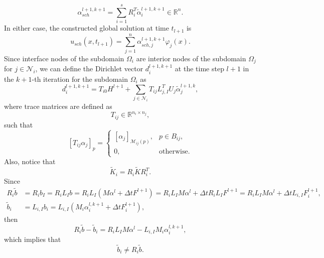 \documentclass[a4paper, 11pt]{article}
\theoremstyle{plain}
\theoremstyle{definition}
\theoremstyle{remark}
\begin{document}
\begin{equation*}
    \alpha_{sch}^{l+1, k+1} = \sum_{i = 1}^{s}R_{i}^{T}\tilde{\alpha}^{l+1, k + 1}_{i}\in \mathbb{R}^{n}.
\end{equation*}
In either case, the constructed global solution at time $t_{l+1}$ is
\begin{equation*}
    u_{sch}(x, t_{l+1}) = \sum_{j=1}^{n}\alpha_{sch, j}^{l+1, k+1}\varphi_{j}(x).
\end{equation*}
Since interface nodes of the subdomain $\Omega_i$ are interior nodes of the subdomain $\Omega_j$ for $j\in\mathcal{N}_{i}$, we can define the 
Dirichlet vector $d^{l+1, k+1}_{i}$ at the time step $l+1$ in the $k+1$-th iteration for the subdomain $\Omega_i$ as
\begin{equation*}
    d^{l+1, k+1}_{i} = T_{i0}H^{l+1} + \sum_{j\in\mathcal{N}_{i}}T_{ij}L_{j, I}^{T}U_{j}\tilde{\alpha}^{l+1, k}_{j},
\end{equation*}
where trace matrices are defined as
\begin{equation*}
    T_{ij} \in \mathbb{R}^{n_{i} \times n_{j}},
\end{equation*}
such that
\begin{equation*}
    \left[T_{ij}\alpha_{j}\right]_{p} = 
    \begin{cases}
        \left[\alpha_{j}\right]_{\mathcal{M}_{ij}(p)}, & p\in B_{ij},\\
        0, & \text{otherwise}.
    \end{cases}
\end{equation*}
Also, notice that
\begin{equation*}
    \tilde{K}_{i} = R_{i}\tilde{K}R_{i}^{T}.
\end{equation*}
Since
\begin{align*}
    R_{i}\tilde{b} &= R_{i}b_{I} = R_{i}L_{I}b = R_{i}L_{I}\left(M \alpha^{l} + \Delta tF^{l+1}\right) = R_{i}L_{I}M \alpha^{l} + \Delta tR_{i}L_{I}F^{l+1} = R_{i}L_{I}M \alpha^{l} + \Delta tL_{i, I}F_{i}^{l+1},\\
    \tilde{b}_{i} &= L_{i, I}b_{i} = L_{i, I}\left(M_{i} \alpha_{i}^{l, k+1} + \Delta tF_{i}^{l+1}\right),
\end{align*}
then
\begin{equation*}
    R_{i}\tilde{b} - \tilde{b}_{i} = R_{i}L_{I}M \alpha^{l} - L_{i, I}M_{i} \alpha_{i}^{l, k+1},
\end{equation*}
which implies that
\begin{equation*}
    \tilde{b}_{i} \neq R_{i}\tilde{b}.
\end{equation*}
\end{document}
